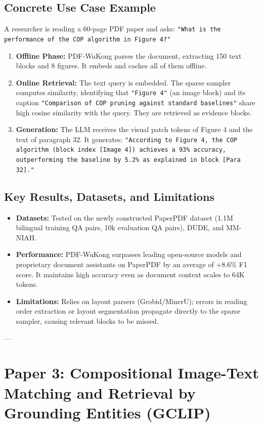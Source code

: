 \documentclass[11pt,a4paper]{article}
\begin{document}
\subsection{Concrete Use Case Example}
A researcher is reading a 60-page PDF paper and asks: \texttt{"What is the performance of the COP algorithm in Figure 4?"}
\begin{enumerate}
    \item \textbf{Offline Phase:} PDF-WuKong parses the document, extracting 150 text blocks and 8 figures. It embeds and caches all of them offline.
    \item \textbf{Online Retrieval:} The text query is embedded. The sparse sampler computes similarity, identifying that \texttt{"Figure 4"} (an image block) and its caption \texttt{"Comparison of COP pruning against standard baselines"} share high cosine similarity with the query. They are retrieved as evidence blocks.
    \item \textbf{Generation:} The LLM receives the visual patch tokens of Figure 4 and the text of paragraph 32. It generates: \texttt{"According to Figure 4, the COP algorithm (block index [Image 4]) achieves a 93\% accuracy, outperforming the baseline by 5.2\% as explained in block [Para 32]."}
\end{enumerate}

\subsection{Key Results, Datasets, and Limitations}
\begin{itemize}
    \item \textbf{Datasets:} Tested on the newly constructed PaperPDF dataset (1.1M bilingual training QA pairs, 10k evaluation QA pairs), DUDE, and MM-NIAH.
    \item \textbf{Performance:} PDF-WuKong surpasses leading open-source models and proprietary document assistants on PaperPDF by an average of +8.6\% F1 score. It maintains high accuracy even as document context scales to 64K tokens.
    \item \textbf{Limitations:} Relies on layout parsers (Grobid/MinerU); errors in reading order extraction or layout segmentation propagate directly to the sparse sampler, causing relevant blocks to be missed.
\end{itemize}

---

\section{Paper 3: Compositional Image-Text Matching and Retrieval by Grounding Entities (GCLIP)}
\label{sec:gclip}
\end{document}
